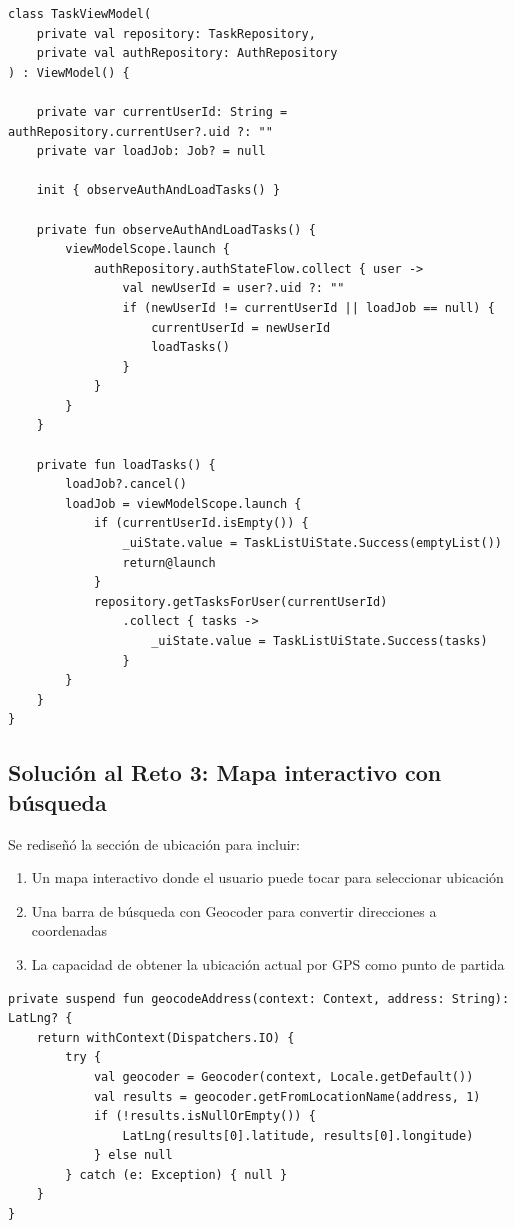 \documentclass[12pt,a4paper]{article}
\begin{document}
\begin{lstlisting}[caption={TaskViewModel con recarga automática por cambio de usuario}]
class TaskViewModel(
    private val repository: TaskRepository,
    private val authRepository: AuthRepository
) : ViewModel() {

    private var currentUserId: String = authRepository.currentUser?.uid ?: ""
    private var loadJob: Job? = null

    init { observeAuthAndLoadTasks() }

    private fun observeAuthAndLoadTasks() {
        viewModelScope.launch {
            authRepository.authStateFlow.collect { user ->
                val newUserId = user?.uid ?: ""
                if (newUserId != currentUserId || loadJob == null) {
                    currentUserId = newUserId
                    loadTasks()
                }
            }
        }
    }

    private fun loadTasks() {
        loadJob?.cancel()
        loadJob = viewModelScope.launch {
            if (currentUserId.isEmpty()) {
                _uiState.value = TaskListUiState.Success(emptyList())
                return@launch
            }
            repository.getTasksForUser(currentUserId)
                .collect { tasks ->
                    _uiState.value = TaskListUiState.Success(tasks)
                }
        }
    }
}
\end{lstlisting}

\subsection{Solución al Reto 3: Mapa interactivo con búsqueda}

Se rediseñó la sección de ubicación para incluir:
\begin{enumerate}
    \item Un mapa interactivo donde el usuario puede tocar para seleccionar ubicación
    \item Una barra de búsqueda con Geocoder para convertir direcciones a coordenadas
    \item La capacidad de obtener la ubicación actual por GPS como punto de partida
\end{enumerate}

\begin{lstlisting}[caption={Geocodificación de direcciones}]
private suspend fun geocodeAddress(context: Context, address: String): LatLng? {
    return withContext(Dispatchers.IO) {
        try {
            val geocoder = Geocoder(context, Locale.getDefault())
            val results = geocoder.getFromLocationName(address, 1)
            if (!results.isNullOrEmpty()) {
                LatLng(results[0].latitude, results[0].longitude)
            } else null
        } catch (e: Exception) { null }
    }
}
\end{lstlisting}
\end{document}
